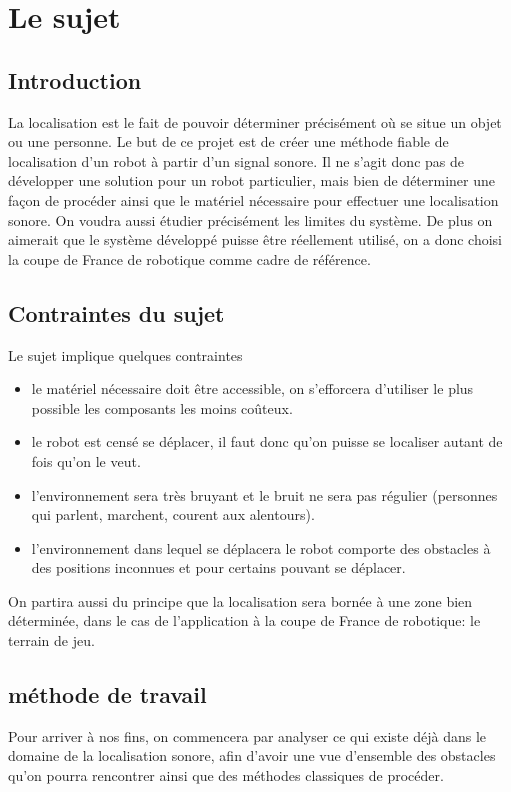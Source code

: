 \documentclass[12pt,a4paper]{report}
\begin{document}
\tableofcontents


\chapter{Le sujet}

\section{Introduction}
La localisation est le fait de pouvoir déterminer précisément où se situe un objet ou une personne. Le but de ce projet est de créer une méthode fiable de localisation d'un robot à partir d'un signal sonore. Il ne s'agit donc pas de développer une solution pour un robot particulier, mais bien de déterminer une façon de procéder ainsi que le matériel nécessaire pour effectuer une localisation sonore. On voudra aussi étudier précisément les limites du système. De plus on aimerait que le système développé puisse être réellement utilisé, on a donc choisi la coupe de France de robotique comme cadre de référence.

\section{Contraintes du sujet}
Le sujet implique quelques contraintes
\begin{itemize}
\item le matériel nécessaire doit être accessible, on s'efforcera d'utiliser le plus possible les composants les moins coûteux.
\item le robot est censé se déplacer, il faut donc qu'on puisse se localiser autant de fois qu'on le veut.
\item l'environnement sera très bruyant et le bruit ne sera pas régulier (personnes qui parlent, marchent, courent aux alentours).
\item l'environnement dans lequel se déplacera le robot comporte des obstacles à des positions inconnues et pour certains pouvant se déplacer.
\end{itemize}
On partira aussi du principe que la localisation sera bornée à une zone bien déterminée, dans le cas de l'application à la coupe de France de robotique: le terrain de jeu. 

\section{méthode de travail}
Pour arriver à nos fins, on commencera par analyser ce qui existe déjà dans le domaine de la localisation sonore, afin d'avoir une vue d'ensemble des obstacles qu'on pourra rencontrer ainsi que des méthodes classiques de procéder.
\end{document}
